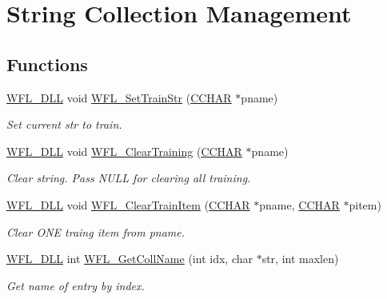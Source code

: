 \hypertarget{group__ddd}{\section{String Collection Management}
\label{group__ddd}
}
\subsection*{Functions}
\begin{DoxyCompactItemize}
\item 
\hyperlink{wflib_8h_a04f24f8cb8df37b828ec454107aeb686}{W\-F\-L\-\_\-\-D\-L\-L} void \hyperlink{group__ddd_ga7474d1e144d78b0eef5d486e60c8b439}{W\-F\-L\-\_\-\-Set\-Train\-Str} (\hyperlink{wflib_8h_a50a88b13633a8142e9172fb5124d729a}{C\-C\-H\-A\-R} $\ast$pname)
\begin{DoxyCompactList}\small\item\em Set current str to train. \end{DoxyCompactList}\item 
\hyperlink{wflib_8h_a04f24f8cb8df37b828ec454107aeb686}{W\-F\-L\-\_\-\-D\-L\-L} void \hyperlink{group__ddd_ga1ea068942b4780bab9e0f3a6b4ed74fe}{W\-F\-L\-\_\-\-Clear\-Training} (\hyperlink{wflib_8h_a50a88b13633a8142e9172fb5124d729a}{C\-C\-H\-A\-R} $\ast$pname)
\begin{DoxyCompactList}\small\item\em Clear string. Pass N\-U\-L\-L for clearing all training. \end{DoxyCompactList}\item 
\hyperlink{wflib_8h_a04f24f8cb8df37b828ec454107aeb686}{W\-F\-L\-\_\-\-D\-L\-L} void \hyperlink{group__ddd_ga216f3cfebb61b508abc8ee78d93ebd73}{W\-F\-L\-\_\-\-Clear\-Train\-Item} (\hyperlink{wflib_8h_a50a88b13633a8142e9172fb5124d729a}{C\-C\-H\-A\-R} $\ast$pname, \hyperlink{wflib_8h_a50a88b13633a8142e9172fb5124d729a}{C\-C\-H\-A\-R} $\ast$pitem)
\begin{DoxyCompactList}\small\item\em Clear O\-N\-E traing item from pname. \end{DoxyCompactList}\item 
\hyperlink{wflib_8h_a04f24f8cb8df37b828ec454107aeb686}{W\-F\-L\-\_\-\-D\-L\-L} int \hyperlink{group__ddd_ga8d939f96fbe278991755c888779299b0}{W\-F\-L\-\_\-\-Get\-Coll\-Name} (int idx, char $\ast$str, int maxlen)
\begin{DoxyCompactList}\small\item\em Get name of entry by index. \end{DoxyCompactList}\item 

\end{DoxyCompactItemize}
